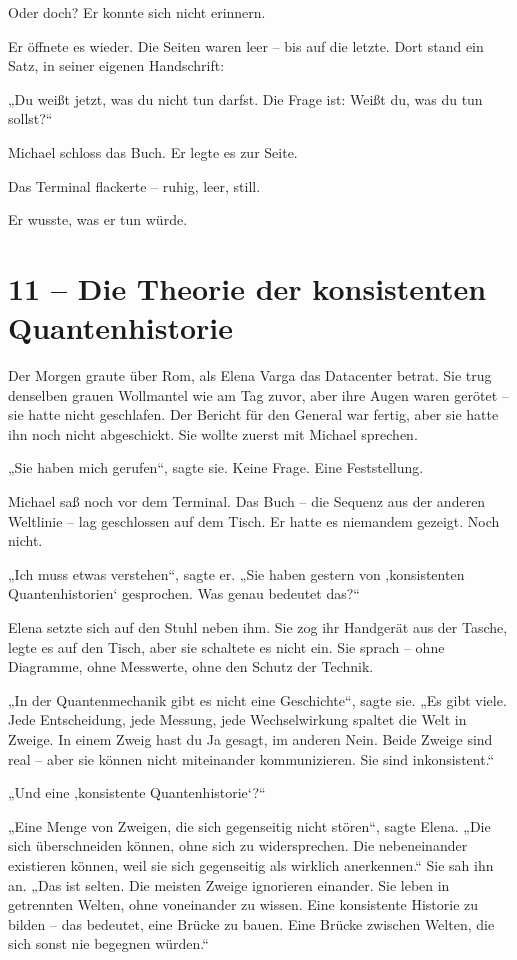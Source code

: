 \documentclass[
]{article}
\begin{document}
Oder doch? Er konnte sich nicht erinnern.

Er öffnete es wieder. Die Seiten waren leer -- bis auf die letzte. Dort stand ein Satz, in seiner eigenen Handschrift:

„Du weißt jetzt, was du nicht tun darfst. Die Frage ist: Weißt du, was du tun sollst?{\kern0pt}``

Michael schloss das Buch. Er legte es zur Seite.

Das Terminal flackerte -- ruhig, leer, still.

Er wusste, was er tun würde.

\section{11 -- Die Theorie der konsistenten Quantenhistorie}\label{die-theorie-der-konsistenten-quantenhistorie}

Der Morgen graute über Rom, als Elena Varga das Datacenter betrat. Sie trug denselben grauen Wollmantel wie am Tag zuvor, aber ihre Augen waren gerötet -- sie hatte nicht geschlafen. Der Bericht für den General war fertig, aber sie hatte ihn noch nicht abgeschickt. Sie wollte zuerst mit Michael sprechen.

„Sie haben mich gerufen``, sagte sie. Keine Frage. Eine Feststellung.

Michael saß noch vor dem Terminal. Das Buch -- die Sequenz aus der anderen Weltlinie -- lag geschlossen auf dem Tisch. Er hatte es niemandem gezeigt. Noch nicht.

„Ich muss etwas verstehen``, sagte er. „Sie haben gestern von ‚konsistenten Quantenhistorien` gesprochen. Was genau bedeutet das?{\kern0pt}``

Elena setzte sich auf den Stuhl neben ihm. Sie zog ihr Handgerät aus der Tasche, legte es auf den Tisch, aber sie schaltete es nicht ein. Sie sprach -- ohne Diagramme, ohne Messwerte, ohne den Schutz der Technik.

„In der Quantenmechanik gibt es nicht eine Geschichte``, sagte sie. „Es gibt viele. Jede Entscheidung, jede Messung, jede Wechselwirkung spaltet die Welt in Zweige. In einem Zweig hast du Ja gesagt, im anderen Nein. Beide Zweige sind real -- aber sie können nicht miteinander kommunizieren. Sie sind inkonsistent.``

„Und eine ‚konsistente Quantenhistorie`?{\kern0pt}``

„Eine Menge von Zweigen, die sich gegenseitig nicht stören``, sagte Elena. „Die sich überschneiden können, ohne sich zu widersprechen. Die nebeneinander existieren können, weil sie sich gegenseitig als wirklich anerkennen.`` Sie sah ihn an. „Das ist selten. Die meisten Zweige ignorieren einander. Sie leben in getrennten Welten, ohne voneinander zu wissen. Eine konsistente Historie zu bilden -- das bedeutet, eine Brücke zu bauen. Eine Brücke zwischen Welten, die sich sonst nie begegnen würden.``
\end{document}
